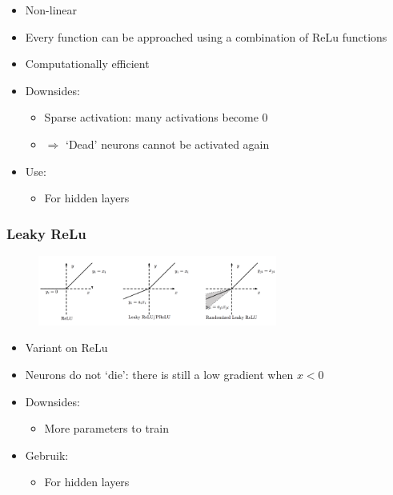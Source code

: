 \documentclass{article}
\begin{document}
\begin{itemize}
    \item Non-linear
    \item Every function can be approached using a combination of ReLu functions
    \item Computationally efficient
    \item Downsides:
    \begin{itemize}
        \item Sparse activation: many activations become 0
        \item $\Rightarrow$ `Dead' neurons cannot be activated again
    \end{itemize}
    \item Use:
    \begin{itemize}
        \item For hidden layers
    \end{itemize}
\end{itemize}


\subsubsection{Leaky ReLu}

\begin{figure}[H]
    \centering
    \includegraphics[width=0.7\textwidth]{leaky-relu.png}
\end{figure}


\begin{itemize}
    \item Variant on ReLu
    \item Neurons do not `die': there is still a low gradient when $x < 0$
    \item Downsides:
    \begin{itemize}
        \item More parameters to train
    \end{itemize}
    \item Gebruik:
    \begin{itemize}
        \item For hidden layers
    \end{itemize}
\end{itemize}
\end{document}
